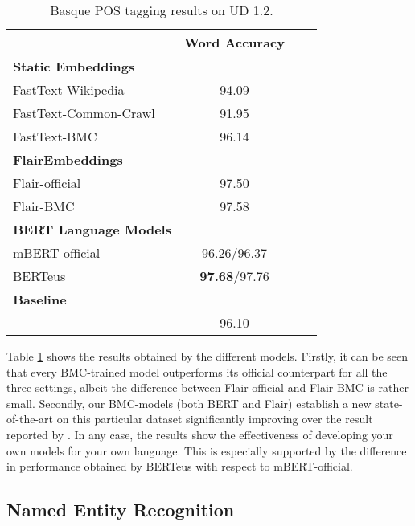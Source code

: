\documentclass[10pt, a4paper]{article}
\begin{document}
\begin{table}[!ht]\footnotesize
\centering
\begin{tabular}{@{\hspace{0.3cm}}lccc} \hline
 \textbf{} & \textbf{Word Accuracy} \\ \hline
\textbf{Static Embeddings} & \\
FastText-Wikipedia & 94.09 \\
FastText-Common-Crawl & 91.95 \\
FastText-BMC  & 96.14 \\ \hline
\textbf{FlairEmbeddings} \\
Flair-official & 97.50 \\
Flair-BMC  &  97.58 \\ \hline
\textbf{BERT Language Models}\\
mBERT-official &  96.26/96.37 \\
BERTeus & \textbf{97.68}/97.76 \\ \hline
\textbf{Baseline} \\
\cite{heinzerling-strube-2019-sequence} & 96.10 \\ \hline
\end{tabular}
\caption{Basque POS tagging results on UD 1.2.}\label{tab:pos}
\end{table}

Table \ref{tab:pos} shows the results obtained by the different models. Firstly, it can be seen that every BMC-trained model outperforms its official counterpart for all the three settings, albeit the difference between Flair-official and Flair-BMC is rather small. Secondly, our BMC-models (both BERT and Flair) establish a new state-of-the-art on this particular dataset significantly improving over the result reported by \cite{heinzerling-strube-2019-sequence}. In any case, the results show the effectiveness of developing your own models for your own language. This is especially supported by the difference in performance obtained by BERTeus with respect to mBERT-official.

\subsection{Named Entity Recognition}\label{sec:named-entity-recogn}
\end{document}
